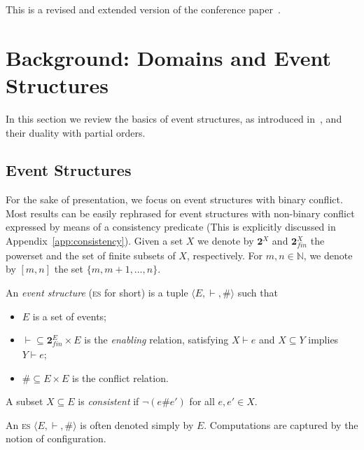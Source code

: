 \documentclass[conference]{IEEEtran}
\newcommand{\esabbr}{\textsc{es}}
\newcommand{\Pow}[1]{\ensuremath{\mathbf{2}^{#1}}}
\newcommand{\Powfin}[1]{\ensuremath{\mathbf{2}_\mathit{fin}^{#1}}}
\newcommand{\interval}[2][1]{\ensuremath{[{#1},{#2}]}}
\begin{document}
This is a revised and extended  version of the conference paper~\cite{BCG:DESF}.

\section{Background: Domains and Event Structures}
\label{se:background}

In this section we review the basics of event structures, as introduced
in~\cite{Win:ES}, and their duality with partial orders.

\subsection{Event Structures}
\label{ss:es}

For the sake of presentation, 
we focus on event structures with binary conflict.
%
Most results can be easily rephrased for event structures with
non-binary conflict expressed by means of a consistency predicate
(This is explicitly discussed in Appendix~\ref{app:consistency}).
%
Given a set $X$ we denote by
$\Pow{X}$ and $\Powfin{X}$ the powerset and the set of finite subsets
of $X$, respectively. For $m,n \in \mathbb{N}$, we denote by
$\interval[m]{n}$ the set $\{ m, m+1, \ldots, n\}$.

\begin{definition}
  \label{de:es}
  An \emph{event structure} ({\esabbr} for short) is a tuple
  $\langle E, \vdash, \# \rangle$ such that
  \begin{itemize}
  \item $E$ is a set of events;
  \item ${\vdash} \subseteq \Powfin{E} \times E$ is the \emph{enabling}
    relation, satisfying $X \vdash e$ and $X \subseteq Y$
    implies $Y \vdash e$;
  \item $\# \subseteq E \times E$ is the conflict relation.
  \end{itemize}
  A subset $X \subseteq E$ is \emph{consistent} if $\neg (e \# e')$
  for all $e, e' \in X$.
\end{definition}


An {\esabbr} $\langle E, \vdash, \# \rangle$ is often
denoted simply by $E$.  Computations are captured by the notion of
configuration.
\end{document}
